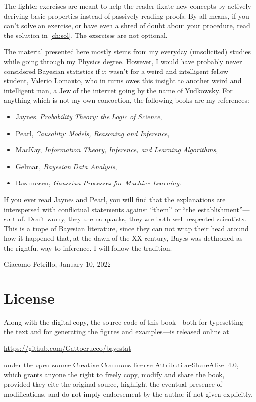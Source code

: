 The lighter exercises are meant to help the reader fixate new concepts by
actively deriving basic properties instead of passively reading proofs. By all
means, if you can't solve an exercise, or have even a shred of doubt about your
procedure, read the solution in \autoref{ch:sol}. The exercises are not
optional.

The material presented here mostly stems from my everyday (unsolicited) studies
while going through my Physics degree. However, I would have probably never
considered Bayesian statistics if it wasn't for a weird and intelligent fellow
student, Valerio Lomanto, who in turns owes this insight to another weird and
intelligent man, a Jew of the internet going by the name of Yudkowsky. For
anything which is not my own concoction, the following books are my references:
%
\begin{itemize}
    \item Jaynes, \emph{Probability Theory: the Logic of Science},
    \item Pearl, \emph{Causality: Models, Reasoning and Inference},
    \item MacKay, \emph{Information Theory, Inference, and Learning Algorithms},
    \item Gelman, \emph{Bayesian Data Analysis},
    \item Rasmussen, \emph{Gaussian Processes for Machine Learning}.
\end{itemize}
%
If you ever read Jaynes and Pearl, you will find that the explanations are
interspersed with conflictual statements against ``them'' or ``the
establishment''---sort of. Don't worry, they are no quacks; they are both well
respected scientists. This is a trope of Bayesian literature, since they can
not wrap their head around how it happened that, at the dawn of the XX century,
Bayes was dethroned as the rightful way to inference. I will follow the
tradition.
%
\begin{flushright}
    Giacomo Petrillo, January 10, 2022
\end{flushright}

\section*{License}

Along with the digital copy, the source code of this book---both for
typesetting the text and for generating the figures and examples---is released
online at
%
\begin{center}
    \url{https://github.com/Gattocrucco/bayestat}
\end{center}
%
under the open source Creative Commons license
\href{https://creativecommons.org/licenses/by-sa/4.0/}{Attribution-ShareAlike~4.0},
which grants anyone the right to freely copy, modify and share the book,
provided they cite the original source, highlight the eventual presence of
modifications, and do not imply endorsement by the author if not given
explicitly.
